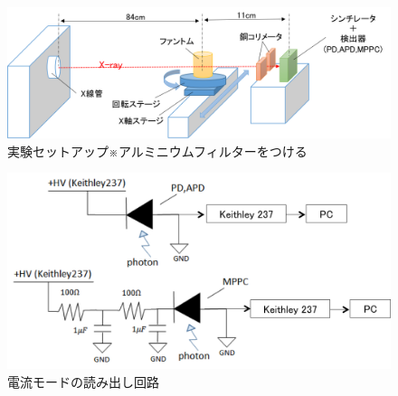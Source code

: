\begin{figure}[H]
 \begin{center}
 \includegraphics[bb=0.000000 0.000000 625.388301 214.062304,width=0.8\hsize]{image2/chapter5/setup.png} 
 \end{center}
 \caption{実験セットアップ※アルミニウムフィルターをつける}
 \label{fig:CTsetup}
\end{figure}



\begin{figure}[H]
 \begin{center}
 \includegraphics[bb=0.000000 0.000000 515.957348 264.458138,width=1\hsize]{image2/chapter5/read_circuit_current.png} 
 \end{center}
 \caption{電流モードの読み出し回路}
 \label{fig:read_circuit_current}
\end{figure}


